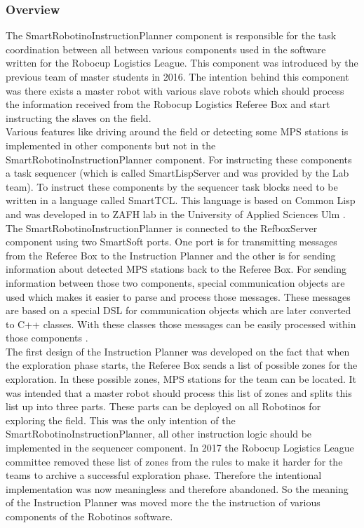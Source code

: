\subsubsection{Overview}
\label{sec:inst_overview}

The SmartRobotinoInstructionPlanner component is responsible for the task coordination between all between various components used in the software written for the 
Robocup Logistics League. This component was introduced by the previous team of master students in 2016. The intention behind this component was there exists a master robot with various slave robots which should process the information received from the Robocup Logistics Referee Box and start instructing the slaves on the field. \\

Various features like driving around the field or detecting some MPS stations is implemented in other components but not in the SmartRobotinoInstructionPlanner component. For instructing these components a task sequencer (which is called SmartLispServer and was provided by the Lab team). To instruct these components by the sequencer task blocks need to be written in a language called SmartTCL. This language is based on Common Lisp and was developed in to ZAFH lab in the University of Applied Sciences Ulm \cite{SS10}.  \\ 

The SmartRobotinoInstructionPlanner is connected to the RefboxServer component using two SmartSoft ports. One port is for transmitting messages from the Referee Box to the Instruction Planner and the other is for sending information about detected MPS stations back to the Referee Box. For sending information between those two components, special communication objects are used which makes it easier to parse and process those messages. These messages are based on a special DSL for communication objects which are later converted to C++ classes. With these classes those messages can be easily processed within those components \cite{CO}. \\

The first design of the Instruction Planner was developed on the fact that when the exploration phase starts, the Referee Box sends a list of possible zones for the exploration. In these possible zones, MPS stations for the team can be located. It was intended that a master robot should process this list of zones and splits this list up into three parts. These parts can be deployed on all Robotinos for exploring the field. This was the only intention of the SmartRobotinoInstructionPlanner, all other instruction logic should be implemented in the sequencer component. In 2017 the Robocup Logistics League committee removed these list of zones from the rules to make it harder for the teams to archive a successful exploration phase. Therefore the intentional implementation was now meaningless and therefore abandoned. So the meaning of the Instruction Planner was moved more the the instruction of various components of the Robotinos software. \\


